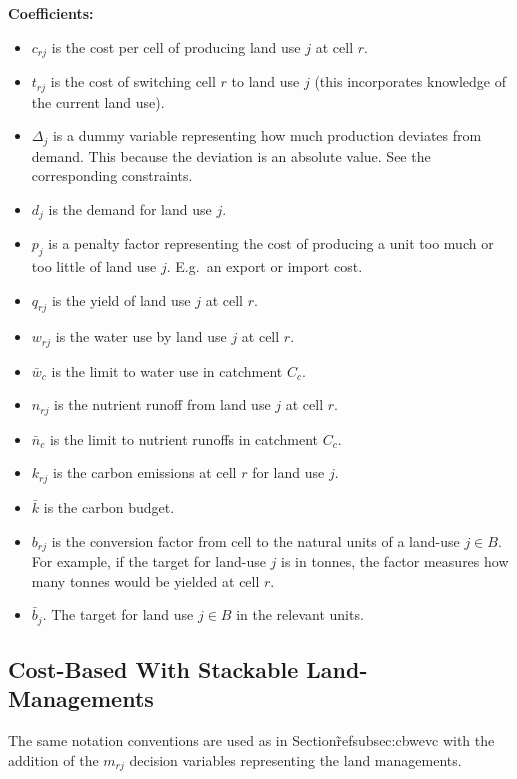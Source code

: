 \documentclass[12pt,a4paper,twoside]{article}
\begin{document}
\textbf{Coefficients:}
\begin{itemize}
	\item $c_{rj}$ is the cost per cell of producing land use $j$ at cell $r$.
	\item $t_{rj}$ is the cost of switching cell $r$ to land use $j$ (this incorporates knowledge of the current land use).
	\item $\Delta_j$ is a dummy variable representing how much production deviates from demand. This because the deviation is an absolute value. See the corresponding constraints.
	\item $d_{j}$ is the demand for land use $j$.
	\item $p_j$ is a penalty factor representing the cost of producing a unit too much or too little of land use $j$. E.g.\ an export or import cost.
	\item $q_{rj}$ is the yield of land use $j$ at cell $r$.
	\item $w_{rj}$ is the water use by land use $j$ at cell $r$.
	\item $\bar{w}_c$ is the limit to water use in catchment $C_c$.
	\item $n_{rj}$ is the nutrient runoff from land use $j$ at cell $r$.
	\item $\bar{n}_c$ is the limit to nutrient runoffs in catchment $C_c$.
	\item $k_{rj}$ is the carbon emissions at cell $r$ for land use $j$.
	\item $\bar{k}$ is the carbon budget.
	\item $b_{rj}$ is the conversion factor from cell to the natural units of a land-use $j \in B$. For example, if the target for land-use $j$ is in tonnes, the factor measures how many tonnes would be yielded at cell $r$.
	\item $\bar{b}_j$. The target for land use $j \in B$ in the relevant units.
\end{itemize}

\newpage

\subsection{Cost-Based With Stackable Land-Managements}\label{subsec:cbwslm}

The same notation conventions are used as in Section\~ref{subsec:cbwevc} with the addition of the $m_{rj}$ decision variables representing the land managements.
\end{document}
